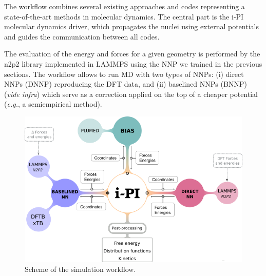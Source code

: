 \documentclass[12pt]{article}
\begin{document}
The workflow combines several existing approaches and codes representing a state-of-the-art methods in molecular dynamics. The central part is the i-PI molecular dynamics driver, which propagates the nuclei using external potentials and guides the communication between all codes. 

The evaluation of the energy and forces for a given geometry is performed by the n2p2 library implemented in LAMMPS using the NNP we trained in the previous sections. The workflow allows to run MD with two types of NNPs: (i) direct NNPs (DNNP) reproducing the DFT data, and (ii) baselined NNPs (BNNP) (\textit{vide infra}) which serve as a correction applied on the top of a cheaper potential (\textit{e.g.}, a semiempirical method). 

\begin{figure}[!htp]
    \centering
    \includegraphics[scale=0.8]{latex_files/diagram_general.png}
    \caption{Scheme of the simulation workflow.}
    \label{fig:workflow}
\end{figure}

\end{document}
